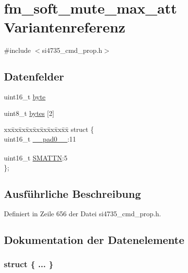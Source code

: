 \hypertarget{unionfm__soft__mute__max__att}{}\section{fm\+\_\+soft\+\_\+mute\+\_\+max\+\_\+att Variantenreferenz}
\label{unionfm__soft__mute__max__att}


{\ttfamily \#include $<$si4735\+\_\+cmd\+\_\+prop.\+h$>$}

\subsection*{Datenfelder}
\begin{DoxyCompactItemize}
\item 
uint16\+\_\+t \hyperlink{unionfm__soft__mute__max__att_ab0549c1b5ea980a02e7eab77e21fea49}{byte}
\item 
uint8\+\_\+t \hyperlink{unionfm__soft__mute__max__att_a46e4c05d20a047ec169f60d3167e912e}{bytes} \mbox{[}2\mbox{]}
\item 
\begin{tabbing}
xx\=xx\=xx\=xx\=xx\=xx\=xx\=xx\=xx\=\kill
struct \{\\
\>uint16\_t \hyperlink{unionfm__soft__mute__max__att_a77132c2c26a75f5b8751b235cda23828}{\_\_pad0\_\_}:11\\
\>\\
\>uint16\_t \hyperlink{unionfm__soft__mute__max__att_a92e22d724c6a2970d60915dab1a06c42}{SMATTN}:5\\
\}; \\

\end{tabbing}\end{DoxyCompactItemize}


\subsection{Ausführliche Beschreibung}


Definiert in Zeile 656 der Datei si4735\+\_\+cmd\+\_\+prop.\+h.



\subsection{Dokumentation der Datenelemente}
\hypertarget{unionfm__soft__mute__max__att_a6dfa02edf52b68e1ed83e77ef65a7993}{}\subsubsection[{"@77}]{\setlength{\rightskip}{0pt plus 5cm}struct \{ ... \} }\label{unionfm__soft__mute__max__att_a6dfa02edf52b68e1ed83e77ef65a7993}
\hypertarget{unionfm__soft__mute__max__att_a77132c2c26a75f5b8751b235cda23828}{}
